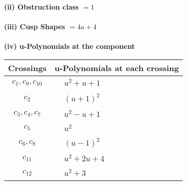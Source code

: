 \documentclass[1p]{elsarticle_modified}
\theoremstyle{definition}
\begin{document}
\flushleft \textbf{(ii) Obstruction class $= 1$}\\~\\
\flushleft \textbf{(iii) Cusp Shapes $= 4 a+4$}\\~\\
\newpage\renewcommand{\arraystretch}{1}
\flushleft \textbf{(iv) u-Polynomials at the component}\newline \\
\begin{tabular}{m{50pt}|m{274pt}}
Crossings & \hspace{64pt}u-Polynomials at each crossing \\
\hline $$\begin{aligned}c_{1},c_{9},c_{10}\end{aligned}$$&$\begin{aligned}
&u^2+u+1
\end{aligned}$\\
\hline $$\begin{aligned}c_{2}\end{aligned}$$&$\begin{aligned}
&(u+1)^2
\end{aligned}$\\
\hline $$\begin{aligned}c_{3},c_{4},c_{7}\end{aligned}$$&$\begin{aligned}
&u^2- u+1
\end{aligned}$\\
\hline $$\begin{aligned}c_{5}\end{aligned}$$&$\begin{aligned}
&u^2
\end{aligned}$\\
\hline $$\begin{aligned}c_{6},c_{8}\end{aligned}$$&$\begin{aligned}
&(u-1)^2
\end{aligned}$\\
\hline $$\begin{aligned}c_{11}\end{aligned}$$&$\begin{aligned}
&u^2+2 u+4
\end{aligned}$\\
\hline $$\begin{aligned}c_{12}\end{aligned}$$&$\begin{aligned}
&u^2+3
\end{aligned}$\\
\hline
\end{tabular}\\~\\
\end{document}
